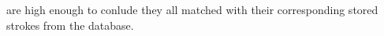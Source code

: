 are high enough to 
conlude they all matched with their corresponding stored strokes from the 
database. 









    





